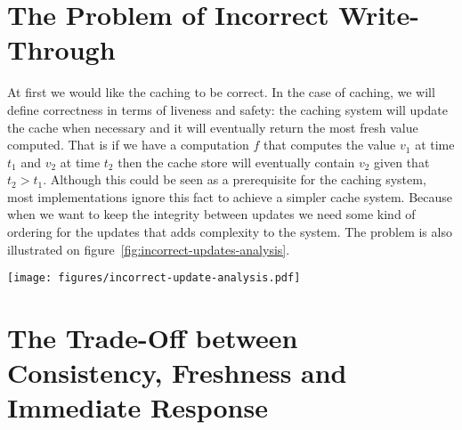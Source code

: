 
\section{The Problem of Incorrect Write-Through}
\label{sec:the_problem_of_incorrect_write_through}


At first we would like the caching to be correct. In the case of caching, we will define correctness in terms of liveness and safety: the caching system will update the cache when necessary and it will eventually return the most fresh value computed. That is if we have a computation $f$ that computes the value $v_1$ at time $t_1$ and $v_2$ at time $t_2$ then the cache store will eventually contain $v_2$ given that $t_2 > t_1$. Although this could be seen as a prerequisite for the caching system, most implementations ignore this fact to achieve a simpler cache system. Because when we want to keep the integrity between updates we need some kind of ordering for the updates that adds complexity to the system. The problem is also illustrated on figure~\ref{fig:incorrect-updates-analysis}.

\begin{figure*}[ht!]
  \centering
  \texttt{[image: figures/incorrect-update-analysis.pdf]}
  \caption{Showing how two concurrent caching updates from two different application servers results in an inconsistent state. We see that even though the request from \emph{Web 2} are based on data older than \emph{Web 1} it gets to write }
  \label{fig:incorrect-updates-analysis}
\end{figure*}



\section{The Trade-Off between Consistency, Freshness and Immediate Response}
\label{sec:the_trade_off_between_consistency_freshness_and_immediate_response}

